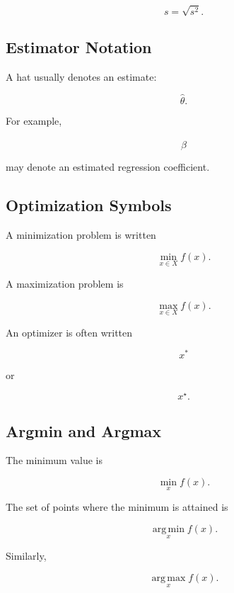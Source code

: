 \[
\boxed{
s=\sqrt{s^2}.
}
\]

\subsection{Estimator Notation}
\label{subsec:estimator-notation-reference}

A hat usually denotes an estimate:

\[
\boxed{
\hat{\theta}.
}
\]

For example,

\[
\boxed{
\hat{\beta}
}
\]

may denote an estimated regression coefficient.

\subsection{Optimization Symbols}
\label{subsec:optimization-symbols-reference}

A minimization problem is written

\[
\boxed{
\min_{x\in X}
f(x).
}
\]

A maximization problem is

\[
\boxed{
\max_{x\in X}
f(x).
}
\]

An optimizer is often written

\[
\boxed{
x^*
}
\]

or

\[
\boxed{
x^\star.
}
\]

\subsection{Argmin and Argmax}
\label{subsec:argmin-argmax-reference}

The minimum value is

\[
\min_x f(x).
\]

The set of points where the minimum is attained is

\[
\boxed{
\operatorname*{arg\,min}_x
f(x).
}
\]

Similarly,

\[
\boxed{
\operatorname*{arg\,max}_x
f(x).
}
\]

